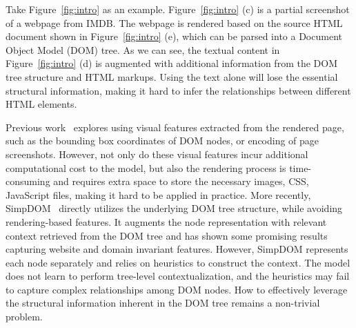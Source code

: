 \documentclass[sigconf, nonacm]{acmart}
\newcommand{\nop}[1]{}
\begin{document}
Take Figure~\ref{fig:intro} as an example. Figure~\ref{fig:intro} (c) is a partial screenshot of a webpage from IMDB. The webpage is rendered based on the source HTML document shown in Figure~\ref{fig:intro} (e), which can be parsed into a Document Object Model (DOM) tree. As we can see, the textual content in Figure~\ref{fig:intro} (d) is augmented with additional information from the DOM  tree structure and HTML markups. Using the text alone will lose the essential structural information, making it hard to infer the relationships between different HTML elements. \nop{Can you briefly give statistics from your analysis during internship that showed how much percent overlap and complementary information you found based on X pages of Y websites?}

Previous work~\cite{lockard-etal-2020-zeroshotceres, chen2021websrc} explores using visual features extracted from the rendered page, such as the bounding box coordinates of DOM nodes, or encoding of page screenshots. However, not only do these visual features incur additional computational cost to the model, but also the rendering process is time-consuming and requires extra space to store the necessary images, CSS, JavaScript files, making it hard to be applied in practice.\nop{Previous work has tried to directly utilize the underlying DOM tree, but primarily focuses on designing heavily-engineered heuristics or features. Early work mainly use the XPath for each node to extract extra structural features~\cite{gulhane2011web, freedom, lockard2018ceres}. Although such Xpath-based features perform well on the training site, they are usually brittle when generalizing to unseen websites that have different layout structures.}
More recently, SimpDOM~\cite{zhou2021simplified} directly utilizes the underlying DOM tree structure, while avoiding rendering-based features. It augments the node representation with relevant context retrieved from the DOM tree and has shown some promising results capturing website and domain invariant features. However, SimpDOM represents each node separately and relies on heuristics to construct the context. The model does not learn to perform tree-level contextualization, and the heuristics may fail to capture complex relationships among DOM nodes. How to effectively leverage the structural information inherent in the DOM tree remains a non-trivial problem. \nop{I think here we can summarize unique challenges faced in this setting that preclude us from using existing pre-trained models like BERT and its variants: 1) Can't apply BERT and variants as is since they only work on text. However, HTML documents are more than text; they contain structure and markup information that provide additional context to the textual semantics. 2) While BERT-like models can capture longer-range dependencies, they have limitations on input size and so cannot be applied to the linearized DOM tree in a straightforward manner without losing important information, thereby demanding a different strategy. (Edit: I see you have now added a paragraph below capturing this. Still would be useful to summarize first and then expand on the points in that paragraph.)}
\end{document}
